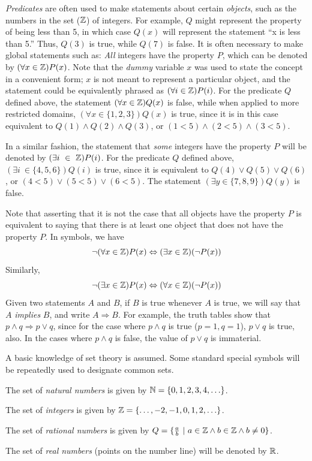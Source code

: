 \emph{Predicates} are often used to make statements about certain \emph{objects}, such as
the numbers in the set ($\mathbb{Z}$) of integers. For example, $Q$ might represent
the property of being less than 5, in which case $Q(x)$ will represent the
statement ``x is less than 5.'' Thus, $Q(3)$ is true, while $Q(7)$ is false. It
is often necessary to make global statements such as: \emph{All} integers have the
property $P$, which can be denoted by $(\forall x \in \mathbb{Z})P(x)$. Note that the
\emph{dummy} variable $x$ was used to state the concept in a convenient form; $x$ is
not meant to represent a particular object, and the statement could be
equivalently phrased as $(\forall i \in \mathbb{Z})P(i)$. For the predicate $Q$ defined
above, the statement $(\forall x \in \mathbb{Z})Q(x)$ is false, while when applied to
more restricted domains, $(\forall x \in\{1,2,3\})Q(x)$ is true, since it is in
this case equivalent to $Q(1) \wedge Q(2) \wedge Q(3)$, or $(1 < 5) \wedge (2 <
5) \wedge (3<5)$.

In a similar fashion, the statement that \emph{some} integers have the property $P$
will be denoted by $(\exists i\ \in\ \ZN)P(i)$. For the predicate $Q$ defined
above, $(\exists i\ \in \{4, 5, 6\})Q(i)$ is true, since it is equivalent to
$Q(4) \vee Q(5) \vee Q(6)$, or $(4 < 5) \vee (5 < 5) \vee (6 < 5).$ The
statement $(\exists y \in\{7, 8, 9\})Q(y)$ is false.

Note that asserting that it is not the case that all objects have the property
$P$ is equivalent to saying that there is at least one object that does not have
the property $P$. In symbols, we have
\[\neg(\forall x\in\mathbb{Z})P(x)\Leftrightarrow(\exists x\in\mathbb{Z})(\neg P(x))\]
Similarly,
\[\neg(\exists x\in\mathbb{Z})P(x)\Leftrightarrow(\forall x\in\mathbb{Z})(\neg P(x))\]
Given two statements $A$ and $B$, if $B$ is true whenever $A$ is true, we will
say that $A$ \emph{implies} $B$, and write $A \Rightarrow B$. For example, the
truth tables show that $p\wedge q\Rightarrow p\vee q$, since for the case where
$p\wedge q$ is true ($p=1,q=1$), $p\vee q$ is true, also. In the cases where $p
\wedge q$ is false, the value of $p\vee q$ is immaterial.

A basic knowledge of set theory is assumed. Some standard special symbols will
be repeatedly used to designate common sets.

\begin{dfn}\label{dfn-0.1}
The set of \emph{natural numbers\/} is given by $\mathbb{N} = \{0,1,2,3,4, \ldots \}$.

The set of \emph{integers\/} is given by $\mathbb{Z} =\{\ldots,-2,-1,0,1,2,\ldots\}$.

The set of \emph{rational numbers\/} is given by $Q=\{\tfrac{a}{b}\ |\ a\in\mathbb{Z}\wedge
b\in\mathbb{Z}\wedge b\neq 0 \}$.

The set of \emph{real numbers\/} (points on the number line) will be denoted by
$\mathbb{R}$.
\end{dfn}

